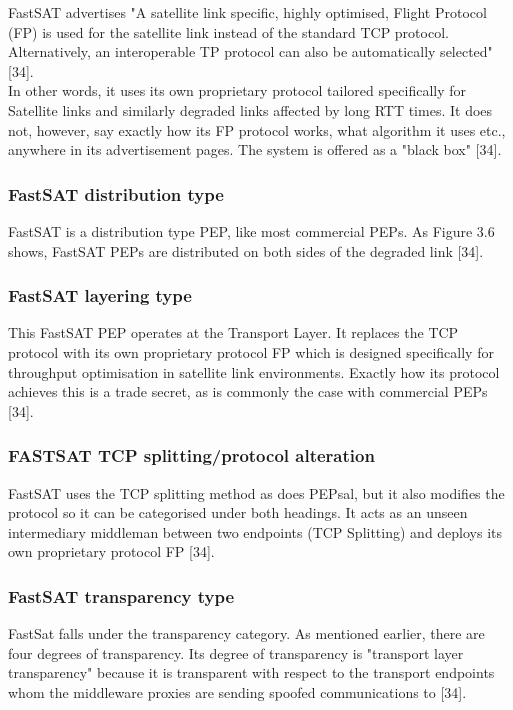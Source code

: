 \documentclass{uathesis}
\begin{document}
FastSAT advertises "A satellite link specific, highly optimised, Flight Protocol (FP) is used for the satellite link instead of the standard TCP protocol. Alternatively, an interoperable TP protocol can also be automatically selected" [34]. \\

In other words, it uses its own proprietary protocol tailored specifically for Satellite links and similarly degraded links affected by long RTT times. It does not, however, say exactly how its FP protocol works, what algorithm it uses etc., anywhere in its advertisement pages. The system is offered as a "black box" [34]. \\

\subsubsection*{FastSAT distribution type}
FastSAT is a distribution type PEP, like most commercial PEPs.  As Figure 3.6 shows, FastSAT PEPs are distributed on both sides of the degraded link [34].

\subsubsection*{FastSAT layering type}
This FastSAT PEP operates at the Transport Layer. It replaces the TCP protocol with its own proprietary protocol FP which is designed specifically for throughput optimisation in satellite link environments. Exactly how its protocol achieves this is a trade secret, as is commonly the case with commercial PEPs [34]. 

\subsubsection*{FASTSAT TCP splitting/protocol alteration}
FastSAT uses the TCP splitting method as does PEPsal, but it also modifies the protocol so it can be categorised under both headings. It acts as an unseen intermediary middleman between two endpoints (TCP Splitting) and deploys its own proprietary protocol FP [34].

\subsubsection*{FastSAT transparency type}
FastSat falls under the transparency category. As mentioned earlier, there are four degrees of transparency. Its degree of transparency is "transport layer transparency" because it is transparent with respect to the transport endpoints whom the middleware proxies are sending spoofed communications to [34]. \\
\end{document}
